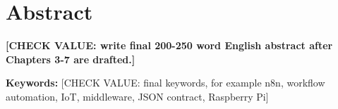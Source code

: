 \section*{Abstract}\label{sec:abstract}

\textbf{[CHECK VALUE: write final 200-250 word English abstract after Chapters 3-7 are drafted.]}

\textbf{Keywords:} [CHECK VALUE: final keywords, for example n8n, workflow automation, IoT, middleware, JSON contract, Raspberry Pi]
